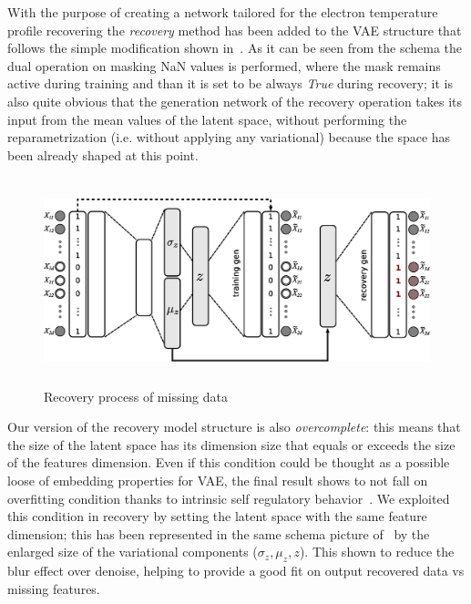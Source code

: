 With the purpose of creating a network tailored for the electron temperature profile recovering the \textit{recovery} method has been added to the VAE structure that follows the simple modification shown in~\Figure{\ref{fig:VAE_recovery}}.
As it can be seen from the schema the dual operation on masking NaN values is performed, where the mask remains active during training and than it is set to be always \textit{True} during recovery; it is also quite obvious that the generation network of the recovery operation takes its input from the mean values of the latent space, without performing the reparametrization (i.e. without applying any variational) because the space has been already shaped at this point.
%
\begin{figure}
    \centering
    \includegraphics[height=6cm]{img/STEP7_CLEAN/VAE_CLEAN.eps}
    \caption{Recovery process of missing data}
    \label{fig:VAE_recovery}
\end{figure}
%
Our version of the recovery model structure is also \textit{overcomplete}: this means that the size of the latent space has its dimension size that equals or exceeds the size of the features dimension. Even if this condition could be thought as a possible loose of embedding properties for VAE, the final result shows to not fall on overfitting condition thanks to intrinsic self regulatory behavior~\cite{dai2017hidden}. We exploited this condition in recovery by setting the latent space with the same feature dimension; this has been represented in the same schema picture of~\Figure{\ref{fig:VAE_recovery}} by the enlarged size of the variational components ($\sigma_z, \mu_z, z$). This shown to reduce the blur effect over denoise, helping to provide a good fit on output recovered data vs missing features.
